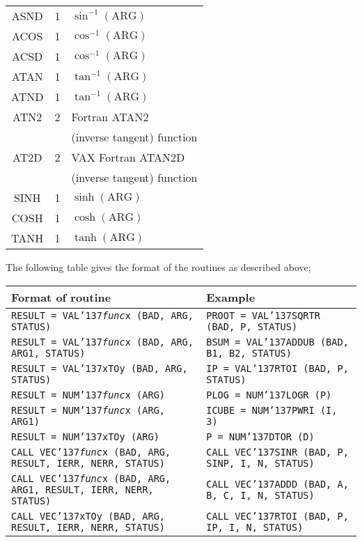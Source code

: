 \documentclass[twoside,11pt]{article}
\renewcommand{\_}{{\tt\char'137}}
\begin{document}
{\begin{tabular}{|c|c|l|}
ASND & 1 & $\sin ^{-1}(\mbox{ARG})$ \\
ACOS & 1 & $\cos ^{-1}(\mbox{ARG})$ \\
ACSD & 1 & $\cos ^{-1}(\mbox{ARG})$ \\
ATAN & 1 & $\tan ^{-1}(\mbox{ARG})$ \\
ATND & 1 & $\tan ^{-1}(\mbox{ARG})$ \\
ATN2 & 2 & Fortran ATAN2 \\
     &   & (inverse tangent) function \\
AT2D & 2 & VAX Fortran ATAN2D\\
     &   & (inverse tangent) function \\
SINH & 1 & $\sinh (\mbox{ARG})$ \\
COSH & 1 & $\cosh (\mbox{ARG})$ \\
TANH & 1 & $\tanh (\mbox{ARG})$ \\ \hline
\end{tabular}
}

\newpage
The following table gives the format of the routines as described above;

{\small
\begin{tabular}{|l|l|} \hline
Format of routine & Example\\ \hline
{\tt RESULT = VAL\_{\sl func\/}x (BAD, ARG, STATUS)}&
{\tt PROOT = VAL\_SQRTR (BAD, P, STATUS)} \\
{\tt RESULT = VAL\_{\sl func\/}x (BAD, ARG, ARG1, STATUS)}&
{\tt BSUM = VAL\_ADDUB (BAD, B1, B2, STATUS)} \\
{\tt RESULT = VAL\_xTOy (BAD, ARG, STATUS)}&
{\tt IP = VAL\_RTOI (BAD, P, STATUS)} \\
{\tt RESULT = NUM\_{\sl func\/}x (ARG)}&
{\tt PLOG = NUM\_LOGR (P)} \\
{\tt RESULT = NUM\_{\sl func\/}x (ARG, ARG1)}&
{\tt ICUBE = NUM\_PWRI (I, 3)} \\
{\tt RESULT = NUM\_xTOy (ARG)}&
{\tt P = NUM\_DTOR (D)} \\
{\tt CALL VEC\_{\sl func\/}x (BAD, ARG, RESULT, IERR, NERR, STATUS)}&
{\tt CALL VEC\_SINR (BAD, P, SINP, I, N, STATUS)} \\
{\tt CALL VEC\_{\sl func\/}x (BAD, ARG, ARG1, RESULT, IERR, NERR, STATUS)}&
{\tt CALL VEC\_ADDD (BAD, A, B, C, I, N, STATUS)} \\
{\tt CALL VEC\_xTOy (BAD, ARG, RESULT, IERR, NERR, STATUS)}&
{\tt CALL VEC\_RTOI (BAD, P, IP, I, N, STATUS)} \\
\hline
\end{tabular}
}
\end{document}
